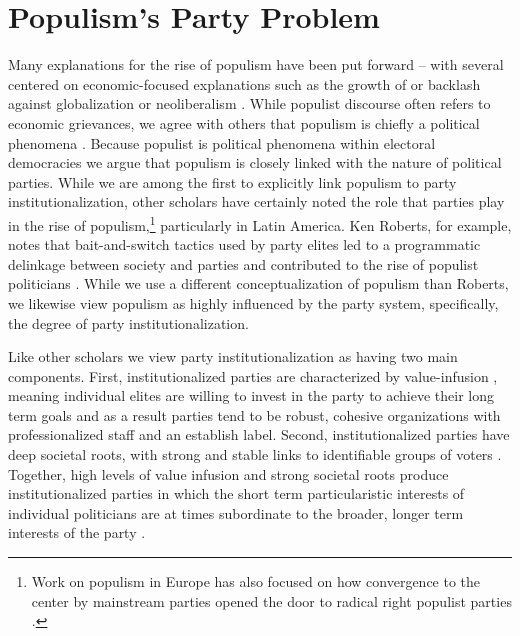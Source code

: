 \documentclass[a4paper,12pt]{article}\usepackage[]{graphicx}\usepackage[]{color}
\begin{document}
\section*{Populism's Party Problem}
Many explanations for the rise of populism have been put forward -- with several centered on economic-focused explanations such as the growth of or backlash against globalization \citep{mughan2003economic, swank2003globalization, kriesi2006globalization, kriesi2008west} or neoliberalism \citep{roberts1995neoliberalism, weyland1999neoliberal}. While populist discourse often refers to economic grievances, we agree with others that populism is chiefly a political phenomena \citep{weyland2001clarifying, roberts2014populism}. Because populist is political phenomena within electoral democracies we argue that populism is closely linked with the nature of political parties. While we are among the first to explicitly link populism to party institutionalization, other scholars have certainly noted the role that parties play in the rise of populism,\footnote{Work on populism in Europe has also focused on how convergence to the center by mainstream parties opened the door to radical right populist parties \citep{kitschelt1997radical, abedi2002challenges, mudde2007populist, carter2011extreme}.} particularly in Latin America. Ken Roberts, for example, notes that bait-and-switch tactics used by party elites led to a programmatic delinkage between society and parties and contributed to the rise of populist politicians \citep{roberts1995neoliberalism, roberts2012politics, roberts2013market}. While we use a different conceptualization of populism than Roberts, we likewise view populism as highly influenced by the party system, specifically, the degree of party institutionalization. 
\par
Like other scholars we view party institutionalization as having two main components. First, institutionalized parties are characterized by value-infusion \citep{levitsky1998institutionalization}, meaning individual elites are willing to invest in the party to achieve their long term goals and as a result parties tend to be robust, cohesive organizations with professionalized staff and an establish label. Second, institutionalized parties have deep societal roots, with strong and stable links to identifiable groups of voters \citep*{mainwaring1995building}. Together, high levels of value infusion and strong societal roots produce institutionalized parties in which the short term particularistic interests of individual politicians are at times subordinate to the broader, longer term interests of the party \citep*{bizzarro2017v}.
\end{document}
